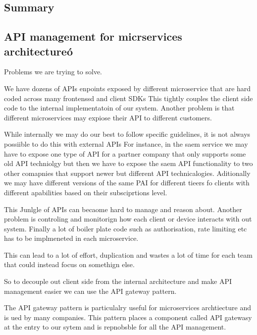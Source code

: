 \documentclass[a4paper, 11pt]{book}
\begin{document}
    \subsection{Summary}

    \subsection{API management for micrservices architectureó}
    Problems we are trying to solve.

    We have dozens of APIs enpoints exposed by different microservice that are hard coded across many frontenssd and client SDKs
    This tightly couples the client side code to the internal implementatoin of our system.
    Another problem is that different microservices may expiose their API to different customers.

    While internally we may do our best to follow specific guidelines, it is not always possiible to do this with external APIs
    For instance, in the saem service we may have to expose one type of API for a partner company that only supports some old API techniolgy but then we have to expose the saem API functionality to two other comapnies that support newer but different API technicalogies.
    Aditionally we may have different versions of the same PAI for different tieers fo clients with different apabilities based on their subsciprtions level.

    This Junlgle of APIs can becaome hard to manage and reason about.
    Another problem is controling and monitorign how each client or device interacts with out system.
    Finally a lot of boiler plate code such as authorisation, rate limiting etc has to be implmeneted in each microservice.

    This can lead to a lot of effort, duplication and wastes a lot of time for each team that could instead focus on somethign else.

    So to decouple out client side from the internal architecture and make API management easier we can use the API gateway pattern.

    The API gateway pattern is particulalry useful for microservices archtiecture and is ued by many companies.
    This pattern places a component called API gatewasy at the entry to our sytem and is repnobsble for all the API management.
\end{document}
